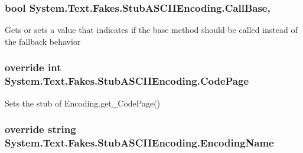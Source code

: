 \hypertarget{class_system_1_1_text_1_1_fakes_1_1_stub_a_s_c_i_i_encoding_a78fd9534f8f52e9d3304fd5c91c35a8e}{
\subsubsection[{Call\-Base}]{\setlength{\rightskip}{0pt plus 5cm}bool System.\-Text.\-Fakes.\-Stub\-A\-S\-C\-I\-I\-Encoding.\-Call\-Base\hspace{0.3cm}{\ttfamily [get]}, {\ttfamily [set]}}}\label{class_system_1_1_text_1_1_fakes_1_1_stub_a_s_c_i_i_encoding_a78fd9534f8f52e9d3304fd5c91c35a8e}


Gets or sets a value that indicates if the base method should be called instead of the fallback behavior

\hypertarget{class_system_1_1_text_1_1_fakes_1_1_stub_a_s_c_i_i_encoding_a8aa75c0e941b251096fc8fc0bbe86aeb}{
\subsubsection[{Code\-Page}]{\setlength{\rightskip}{0pt plus 5cm}override int System.\-Text.\-Fakes.\-Stub\-A\-S\-C\-I\-I\-Encoding.\-Code\-Page\hspace{0.3cm}{\ttfamily [get]}}}\label{class_system_1_1_text_1_1_fakes_1_1_stub_a_s_c_i_i_encoding_a8aa75c0e941b251096fc8fc0bbe86aeb}


Sets the stub of Encoding.\-get\-\_\-\-Code\-Page()

\hypertarget{class_system_1_1_text_1_1_fakes_1_1_stub_a_s_c_i_i_encoding_a31b1566adda0242432135919409d8a8a}{
\subsubsection[{Encoding\-Name}]{\setlength{\rightskip}{0pt plus 5cm}override string System.\-Text.\-Fakes.\-Stub\-A\-S\-C\-I\-I\-Encoding.\-Encoding\-Name\hspace{0.3cm}{\ttfamily [get]}}}\label{class_system_1_1_text_1_1_fakes_1_1_stub_a_s_c_i_i_encoding_a31b1566adda0242432135919409d8a8a}


